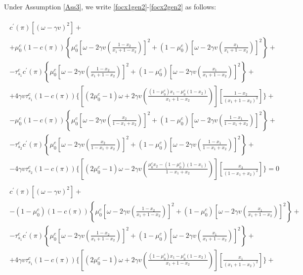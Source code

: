 \documentclass[12pt,a4paper]{article}
\begin{document}
Under Assumption \ref{Ass3}, we write \eqref{focx1gen2}-\eqref{focx2gen2} as follows:
\begin{small}
\begin{eqnarray}
\label{focx12}
    \begin{split}
        c^\prime(\pi)\left[(\omega-\gamma v)^2\right]+ \\
        +\mu_0^c(1-c(\pi))\left\{\mu_0^c\left[\omega-2\gamma v\left(\frac{1-x_2}{x_1+1-x_2}\right)\right]^2+(1-\mu_0^c)\left[\omega-2\gamma v\left(\frac{x_1}{x_1+1-x_2}\right)\right]^2\right\}+ \\
        -\tau_{s_1}^cc^\prime(\pi)\left\{\mu_0^c\left[\omega-2\gamma v\left(\frac{1-x_2}{x_1+1-x_2}\right)\right]^2+(1-\mu_0^c)\left[\omega-2\gamma v\left(\frac{x_1}{x_1+1-x_2}\right)\right]^2\right\}+ \\
        +4\gamma v\tau_{s_1}^c(1-c(\pi))\Bigg\{\left[(2\mu_0^c-1)\omega+2\gamma v\left(\frac{(1-\mu_0^c)x_1-\mu_0^c(1-x_2)}{x_1+1-x_2}\right)\right]\left[\frac{1-x_2}{(x_1+1-x_2)^2}\right]\Bigg\}+\\
        -\mu_0^c(1-c(\pi))\left\{\mu_0^c\left[\omega-2\gamma v\left(\frac{x_2}{1-x_1+x_2}\right)\right]^2+(1-\mu_0^c)\left[\omega-2\gamma v\left(\frac{1-x_1}{1-x_1+x_2}\right)\right]^2\right\}+\\
        -\tau_{s_2}^cc^\prime(\pi)\left\{\mu_0^c\left[\omega-2\gamma v\left(\frac{x_2}{1-x_1+x_2}\right)\right]^2+(1-\mu_0^c)\left[\omega-2\gamma v\left(\frac{1-x_1}{1-x_1+x_2}\right)\right]^2\right\}+\\
        -4\gamma v\tau_{s_2}^c(1-c(\pi))\Bigg\{\left[(2\mu_0^c-1)\omega-2\gamma v\left(\frac{\mu_0^cx_2-(1-\mu_0^c)(1-x_1)}{1-x_1+x_2}\right)\right]\left[\frac{x_2}{(1-x_1+x_2)^2}\right]\Bigg\}=0
    \end{split} \\
    \label{focx22}
    \begin{split}
        c^\prime(\pi)\left[(\omega-\gamma v)^2\right]+ \\
        -(1-\mu_0^c)(1-c(\pi))\left\{\mu_0^c\left[\omega-2\gamma v\left(\frac{1-x_2}{x_1+1-x_2}\right)\right]^2+(1-\mu_0^c)\left[\omega-2\gamma v\left(\frac{x_1}{x_1+1-x_2}\right)\right]^2\right\}+ \\
        -\tau_{s_1}^cc^\prime(\pi)\left\{\mu_0^c\left[\omega-2\gamma v\left(\frac{1-x_2}{x_1+1-x_2}\right)\right]^2+(1-\mu_0^c)\left[\omega-2\gamma v\left(\frac{x_1}{x_1+1-x_2}\right)\right]^2\right\}+ \\
        +4\gamma v\tau_{s_1}^c(1-c(\pi))\Bigg\{\left[(2\mu_0^c-1)\omega+2\gamma v\left(\frac{(1-\mu_0^c)x_1-\mu_0^c(1-x_2)}{x_1+1-x_2}\right)\right]\left[\frac{x_1}{(x_1+1-x_2)^2}\right]\Bigg\}+\\

\end{split}
\end{eqnarray}
\end{small}
\end{document}
